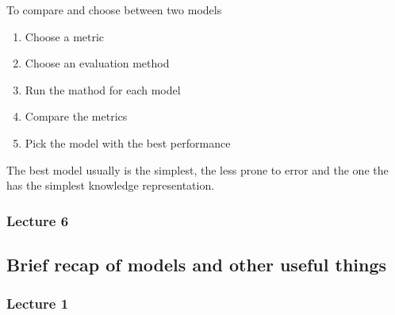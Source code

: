 \vspace{10pt}

To compare and choose between two models

\begin{enumerate}
    \item Choose a metric
    \item Choose an evaluation method
    \item Run the mathod for each model
    \item Compare the metrics
    \item Pick the model with the best performance
\end{enumerate}

The best model usually is the simplest, the less prone to error and the one the has the simplest knowledge representation.


\subsubsection{Lecture 6}
















\subsection{Brief recap of models and other useful things}

\subsubsection{Lecture 1}

